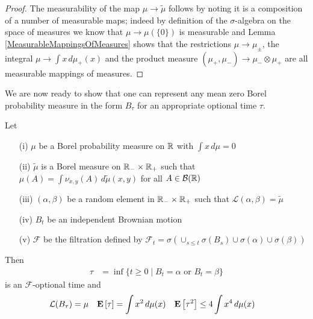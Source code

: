 \begin{proof}
The measurability of the map $\mu \to \tilde{\mu}$ follows by noting
it is a composition of a number of measurable maps; indeed by
definition of the $\sigma$-algebra on the space of measures we know
that $\mu \to \mu(\lbrace 0 \rbrace)$ is measurable and Lemma
\ref{MeasurableMappingsOfMeasures} shows that the restrictions $\mu
\to \mu_{\pm}$, the integral $\mu \to \int x \, d\mu_+(x)$ and the
product measure $(\mu_+, \mu_-) \to \mu_- \otimes \mu_+$ are all
measurable mappings of measures.
\end{proof}

We are now ready to show that one can represent any mean zero Borel
probability measure in the form $B_\tau$ for an appropriate optional
time $\tau$.

\begin{lem}\label{EmbeddingSingleRandomVariableInBrownian}Let 
\begin{itemize}
\item[(i)] $\mu$ be a Borel probability measure on $\mathbb{R}$ with $\int x
  \, d\mu = 0$
\item[(ii)] $\tilde{\mu}$ is a Borel measure on $\mathbb{R}_-
  \times \mathbb{R}_+$ such that $\mu(A) = \int \nu_{x,y}(A) \,
  d\tilde{\mu}(x,y)$ for all $A \in \mathcal{B}(\mathbb{R})$
\item[(iii)] $(\alpha, \beta)$ be a random element in $\mathbb{R}_-
  \times \mathbb{R}_+$ such that $\mathcal{L}(\alpha, \beta) =
  \tilde{\mu}$
\item[(iv)] $B_t$ be an independent Brownian motion
\item[(v)] $\mathcal{F}$ be the filtration defined by $\mathcal{F}_t =
  \sigma( \cup_{s \leq t} \sigma(B_s) \cup \sigma(\alpha) \cup \sigma(\beta))$
\end{itemize}
Then 
\begin{align*}
\tau &= \inf \lbrace t \geq 0 \mid B_t = \alpha \text { or } B_t =
\beta \rbrace
\end{align*}
is an $\mathcal{F}$-optional time and 
\begin{align*}
\mathcal{L}(B_\tau) &= \mu & \textbf{E}\left[\tau\right] &= \int x^2 \, d\mu(x)
& \textbf{E}\left[\tau^2\right] &\leq 4 \int x^4 \, d\mu(x)
\end{align*}
\end{lem}
